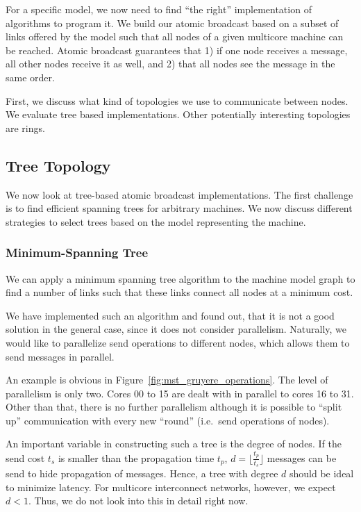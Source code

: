 \documentclass{article}
\begin{document}
For a specific model, we now need to find ``the right'' implementation
of algorithms to program it. We build our atomic broadcast based on a
subset of links offered by the model such that all nodes of a given
multicore machine can be reached. Atomic broadcast guarantees that 1)
if one node receives a message, all other nodes receive it as well,
and 2) that all nodes see the message in the same order.

First, we discuss what kind of topologies we use to communicate
between nodes. We evaluate tree based implementations. Other
potentially interesting topologies are rings.

\subsection{Tree Topology}

We now look at tree-based atomic broadcast implementations. The first
challenge is to find efficient spanning trees for arbitrary
machines. We now discuss different strategies to select trees based on
the model representing the machine.

\subsubsection{Minimum-Spanning Tree}
\label{sec:mst_tree}

We can apply a minimum spanning tree algorithm to the machine model
graph to find a number of links such that these links connect all
nodes at a minimum cost.

We have implemented such an algorithm and found out, that it is not a
good solution in the general case, since it does not consider
parallelism. Naturally, we would like to parallelize send operations
to different nodes, which allows them to send messages in parallel. 

An example is obvious in Figure~\ref{fig:mst_gruyere_operations}. The
level of parallelism is only two. Cores 00 to 15 are dealt with in
parallel to cores 16 to 31. Other than that, there is no further
parallelism although it is possible to ``split up'' communication with
every new ``round'' (i.e.\ send operations of nodes).

An important variable in constructing such a tree is the degree of
nodes. If the send cost $t_s$ is smaller than the propagation time
$t_p$, $d = \lfloor \frac{t_p}{t_s} \rfloor$ messages can be send to
hide propagation of messages. Hence, a tree with degree $d$ should be
ideal to minimize latency. For multicore interconnect networks,
however, we expect $d<1$. Thus, we do not look into this in detail
right now.
\end{document}
